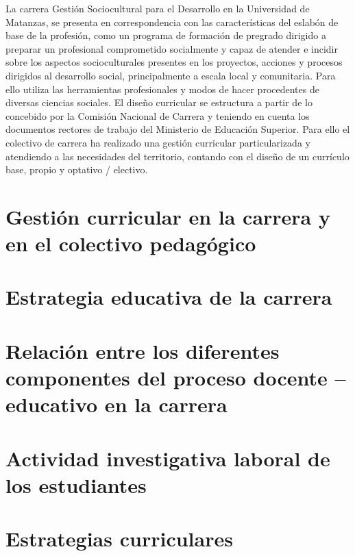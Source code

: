 La carrera Gestión Sociocultural para el Desarrollo en la Universidad de Matanzas, se presenta en correspondencia con las características del eslabón de base de la profesión, como un programa de formación de pregrado dirigido a preparar un profesional comprometido socialmente y capaz de atender e incidir sobre los aspectos socioculturales presentes en los proyectos, acciones y procesos dirigidos al desarrollo social, principalmente a escala local y comunitaria. Para ello utiliza las herramientas profesionales y modos de hacer procedentes de diversas ciencias sociales.
El diseño curricular se estructura a partir de lo concebido por la Comisión Nacional de Carrera y teniendo en cuenta los documentos rectores de trabajo del Ministerio de Educación Superior. Para ello el colectivo de carrera ha realizado una gestión curricular particularizada y atendiendo a las necesidades del territorio, contando con el diseño de un currículo base, propio y optativo / electivo. 

\section{Gestión curricular en la carrera y en el colectivo pedagógico}



\section{Estrategia educativa de la carrera}



\section{Relación entre los diferentes componentes del proceso docente – educativo en la carrera}



\section{Actividad investigativa laboral de los estudiantes}



\section{Estrategias curriculares }

